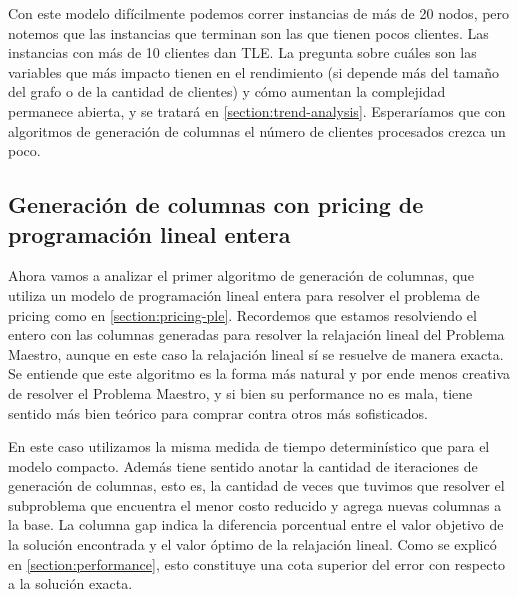 Con este modelo difícilmente podemos correr instancias de más de 20 nodos, pero notemos que las instancias que terminan son las que tienen pocos clientes. Las instancias con más de 10 clientes dan TLE. La pregunta sobre cuáles son las variables que más impacto tienen en el rendimiento (si depende más del tamaño del grafo o de la cantidad de clientes) y cómo aumentan la complejidad permanece abierta, y se tratará en \ref{section:trend-analysis}. Esperaríamos que con algoritmos de generación de columnas el número de clientes procesados crezca un poco. 

\subsection{Generación de columnas con pricing de programación lineal entera}
\label{section:experiment-pricing-ple}

Ahora vamos a analizar el primer algoritmo de generación de columnas, que utiliza un modelo de programación lineal entera para resolver el problema de pricing como en \ref{section:pricing-ple}. Recordemos que estamos resolviendo el  entero con las columnas generadas para resolver la relajación lineal del Problema Maestro, aunque en este caso la relajación lineal sí se resuelve de manera exacta. Se entiende que este algoritmo es la forma más natural y por ende menos creativa de resolver el Problema Maestro, y si bien su performance no es mala, tiene sentido más bien teórico para comprar contra otros más sofisticados.

En este caso utilizamos la misma medida de tiempo determinístico que para el modelo compacto. Además tiene sentido anotar la cantidad de iteraciones de generación de columnas, esto es, la cantidad de veces que tuvimos que resolver el subproblema que encuentra el menor costo reducido y agrega nuevas columnas a la base. La columna gap indica la diferencia porcentual entre el valor objetivo de la solución encontrada y el valor óptimo de la relajación lineal. Como se explicó en \ref{section:performance}, esto constituye una cota superior del error con respecto a la solución exacta. 

